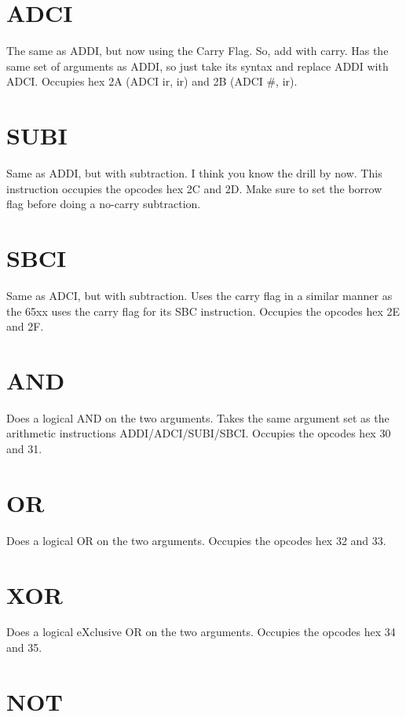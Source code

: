 \documentclass[letterpaper,12pt]{book}
\begin{document}
\section{ADCI}

The same as ADDI, but now using the Carry Flag. So, add with carry. Has the same set of arguments as ADDI, so just take its syntax and replace ADDI with ADCI. Occupies hex 2A (ADCI ir, ir) and 2B (ADCI \#, ir).

\section{SUBI}

Same as ADDI, but with subtraction. I think you know the drill by now. This instruction occupies the opcodes hex 2C and 2D. Make sure to set the borrow flag before doing a no-carry subtraction.

\section{SBCI}

Same as ADCI, but with subtraction. Uses the carry flag in a similar manner as the 65xx uses the carry flag for its SBC instruction. Occupies the opcodes hex 2E and 2F.

\section{AND}

Does a logical AND on the two arguments. Takes the same argument set as the arithmetic instructions ADDI/ADCI/SUBI/SBCI. Occupies the opcodes hex 30 and 31.

\section{OR}

Does a logical OR on the two arguments. Occupies the opcodes hex 32 and 33.

\section{XOR}

Does a logical eXclusive OR on the two arguments. Occupies the opcodes hex 34 and 35.

\section{NOT}
\end{document}
